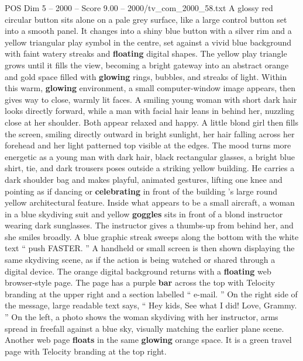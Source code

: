 \begin{textsample}{POS Dim 5 – 2000 – Score 9.00 – 2000/tv\_com\_2000\_58.txt}  \label{ex:f5_pos_025}
A glossy red circular button sits alone on a pale grey surface, like a large control button set into a smooth panel.
It changes into a shiny blue button with a silver rim and a yellow triangular play symbol in the centre, set against a vivid blue background with faint watery streaks and \textbf{floating} digital shapes.
The yellow play triangle grows until it fills the view, becoming a bright gateway into an abstract orange and gold space filled with \textbf{glowing} rings, bubbles, and streaks of light.
Within this warm, \textbf{glowing} environment, a small computer-window image appears, then gives way to close, warmly lit faces.
A smiling young woman with short dark hair looks directly forward, while a man with facial hair leans in behind her, nuzzling close at her shoulder.
Both appear relaxed and happy.
A little blond girl then fills the screen, smiling directly outward in bright sunlight, her hair falling across her forehead and her light patterned top visible at the edges.
The mood turns more energetic as a young man with dark hair, black rectangular glasses, a bright blue shirt, tie, and dark trousers poses outside a striking yellow building.
He carries a dark shoulder bag and makes playful, animated gestures, lifting one knee and pointing as if dancing or \textbf{celebrating} in front of the building ’s large round yellow architectural feature.
Inside what appears to be a small aircraft, a woman in a blue skydiving suit and yellow \textbf{goggles} sits in front of a blond instructor wearing dark sunglasses.
The instructor gives a thumbs-up from behind her, and she smiles broadly.
A blue graphic streak sweeps along the bottom with the white text “ push FASTER. ” A handheld or small screen is then shown displaying the same skydiving scene, as if the action is being watched or shared through a digital device.
The orange digital background returns with a \textbf{floating} web browser-style page.
The page has a purple \textbf{bar} across the top with Telocity branding at the upper right and a section labelled “ e-mail. ” On the right side of the message, large readable text says, “ Hey kids, See what I did!
Love, Grammy. ” On the left, a photo shows the woman skydiving with her instructor, arms spread in freefall against a blue sky, visually matching the earlier plane scene.
Another web page \textbf{floats} in the same \textbf{glowing} orange space.
It is a green travel page with Telocity branding at the top right.

\end{textsample}
